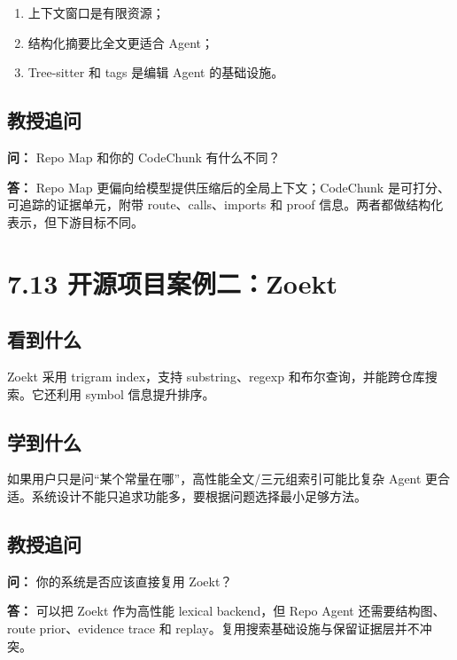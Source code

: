 \documentclass[UTF8,12pt,openany]{ctexbook}
\begin{document}
\begin{enumerate}
\item 上下文窗口是有限资源；
\item 结构化摘要比全文更适合 Agent；
\item Tree-sitter 和 tags 是编辑 Agent 的基础设施。
\end{enumerate}

\subsection{教授追问}

\textbf{问：} Repo Map 和你的 CodeChunk 有什么不同？\par

\textbf{答：} Repo Map 更偏向给模型提供压缩后的全局上下文；CodeChunk 是可打分、可追踪的证据单元，附带 route、calls、imports 和 proof 信息。两者都做结构化表示，但下游目标不同。\par

\section{7.13 开源项目案例二：Zoekt}

\subsection{看到什么}

Zoekt 采用 trigram index，支持 substring、regexp 和布尔查询，并能跨仓库搜索。它还利用 symbol 信息提升排序。\par

\subsection{学到什么}

如果用户只是问“某个常量在哪”，高性能全文/三元组索引可能比复杂 Agent 更合适。系统设计不能只追求功能多，要根据问题选择最小足够方法。\par

\subsection{教授追问}

\textbf{问：} 你的系统是否应该直接复用 Zoekt？\par

\textbf{答：} 可以把 Zoekt 作为高性能 lexical backend，但 Repo Agent 还需要结构图、route prior、evidence trace 和 replay。复用搜索基础设施与保留证据层并不冲突。\par
\end{document}
